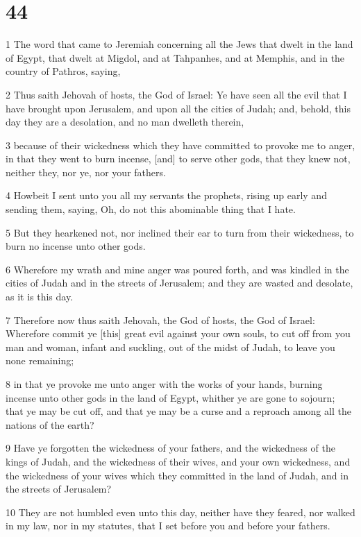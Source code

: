 \chapter{44}

\par 1 The word that came to Jeremiah concerning all the Jews that dwelt in the land of Egypt, that dwelt at Migdol, and at Tahpanhes, and at Memphis, and in the country of Pathros, saying,
\par 2 Thus saith Jehovah of hosts, the God of Israel: Ye have seen all the evil that I have brought upon Jerusalem, and upon all the cities of Judah; and, behold, this day they are a desolation, and no man dwelleth therein,
\par 3 because of their wickedness which they have committed to provoke me to anger, in that they went to burn incense, [and] to serve other gods, that they knew not, neither they, nor ye, nor your fathers.
\par 4 Howbeit I sent unto you all my servants the prophets, rising up early and sending them, saying, Oh, do not this abominable thing that I hate.
\par 5 But they hearkened not, nor inclined their ear to turn from their wickedness, to burn no incense unto other gods.
\par 6 Wherefore my wrath and mine anger was poured forth, and was kindled in the cities of Judah and in the streets of Jerusalem; and they are wasted and desolate, as it is this day.
\par 7 Therefore now thus saith Jehovah, the God of hosts, the God of Israel: Wherefore commit ye [this] great evil against your own souls, to cut off from you man and woman, infant and suckling, out of the midst of Judah, to leave you none remaining;
\par 8 in that ye provoke me unto anger with the works of your hands, burning incense unto other gods in the land of Egypt, whither ye are gone to sojourn; that ye may be cut off, and that ye may be a curse and a reproach among all the nations of the earth?
\par 9 Have ye forgotten the wickedness of your fathers, and the wickedness of the kings of Judah, and the wickedness of their wives, and your own wickedness, and the wickedness of your wives which they committed in the land of Judah, and in the streets of Jerusalem?
\par 10 They are not humbled even unto this day, neither have they feared, nor walked in my law, nor in my statutes, that I set before you and before your fathers.
